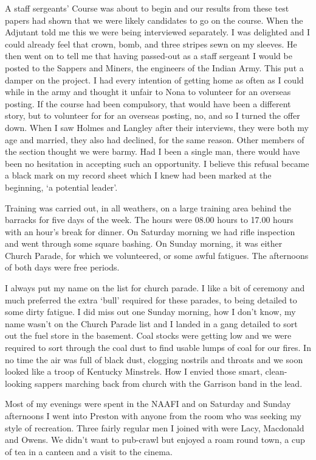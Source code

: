 A staff sergeants' Course was about to begin and our results from
these test papers had shown that we were likely candidates to go on
the course. When the Adjutant told me this we were being interviewed
separately. I was delighted and I could already feel that crown,
bomb, and three stripes sewn on my sleeves. He then went on to tell
me that having passed-out as a staff sergeant I would be posted to the
Sappers and Miners, the engineers of the Indian Army. This put a
damper on the project. I had every intention of getting home as often
as I could while in the army and thought it unfair to Nona to
volunteer for an overseas posting. If the course had been compulsory,
that would have been a different story, but to volunteer for for an
overseas posting, no, and so I turned the offer down. When I saw
Holmes and Langley after their interviews, they were both my age and
married, they also had declined, for the same reason. Other members
of the section thought we were barmy. Had I been a single man, there
would have been no hesitation in accepting such an opportunity. I
believe this refusal became a black mark on my record sheet which I
knew had been marked at the beginning, `a potential leader'.

Training was carried out, in all weathers, on a large training area
behind the barracks for five days of the week. The hours were 08.00
hours to 17.00 hours with an hour's break for dinner. On Saturday
morning we had rifle inspection and went through some square bashing.
On Sunday morning, it was either Church Parade, for which we
volunteered, or some awful fatigues. The afternoons of both days were
free periods.

I always put my name on the list for church parade. I like a bit of
ceremony and much preferred the extra `bull' required for these
parades, to being detailed to some dirty fatigue. I did miss out one
Sunday morning, how I don't know, my name wasn't on the Church
Parade list and I landed in a gang detailed to sort out the fuel store
in the basement. Coal stocks were getting low and we were required to
sort through the coal dust to find usable lumps of coal for our fires.
In no time the air was full of black dust, clogging nostrils and
throats and we soon looked like a troop of Kentucky Minstrels. How I
envied those smart, clean-looking sappers marching back from church
with the Garrison band in the lead.

Most of my evenings were spent in the NAAFI and on Saturday and Sunday
afternoons I went into Preston with anyone from the room who was
seeking my style of recreation. Three fairly regular men I joined
with were Lacy, Macdonald and Owens. We didn't want to pub-crawl but
enjoyed a roam round town, a cup of tea in a canteen and a visit to
the cinema.

